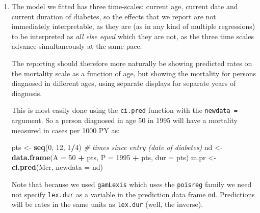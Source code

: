 \documentclass[
]{book}
\newenvironment{Shaded}{\begin{snugshade}}{\end{snugshade}}
\newcommand{\AttributeTok}[1]{\textcolor[rgb]{0.13,0.29,0.53}{#1}}
\newcommand{\CommentTok}[1]{\textcolor[rgb]{0.56,0.35,0.01}{\textit{#1}}}
\newcommand{\DecValTok}[1]{\textcolor[rgb]{0.00,0.00,0.81}{#1}}
\newcommand{\FunctionTok}[1]{\textcolor[rgb]{0.13,0.29,0.53}{\textbf{#1}}}
\newcommand{\NormalTok}[1]{#1}
\newcommand{\OtherTok}[1]{\textcolor[rgb]{0.56,0.35,0.01}{#1}}
\newcommand{\SpecialCharTok}[1]{\textcolor[rgb]{0.81,0.36,0.00}{\textbf{#1}}}
\theoremstyle{definition}
\theoremstyle{definition}
\theoremstyle{definition}
\theoremstyle{definition}
\theoremstyle{remark}
\begin{document}
\begin{enumerate}
\begin{verbatim}
Analysis of Deviance Table

Model 1: cbind(trt(Lx$lex.Cst, Lx$lex.Xst) %in% trnam, Lx$lex.dur) ~ s(A, 
    bs = "cr", k = 10) + s(P, bs = "cr", k = 10) + s(dur, bs = "cr", 
    k = 10)
Model 2: cbind(trt(Lx$lex.Cst, Lx$lex.Xst) %in% trnam, Lx$lex.dur) ~ s(A, 
    k = 10)
  Resid. Df Resid. Dev      Df Deviance  Pr(>Chi)
1     58112      10204                           
2     58122      10268 -9.4572  -63.366 4.812e-10
\end{verbatim}

  What do you conclude?
\item
  The model we fitted has three time-scales: current age, current
  date and current duration of diabetes, so the effects that we report
  are not immediately interpretable, as they are (as in any kind of
  multiple regressions) to be interpreted as \emph{all else equal} which
  they are not, as the three time scales advance simultaneously at the
  same pace.

  The reporting should therefore more naturally be showing predicted rates on the
  mortality scale as a function of age, but showing the mortality
  for persons diagnosed in different ages, using separate displays
  for separate years of diagnosis.

  This is most easily done using the \texttt{ci.pred} function with
  the \texttt{newdata\ =} argument. So a person diagnosed in age 50 in
  1995 will have a mortality measured in cases per 1000 PY as:

\begin{Shaded}
\begin{Highlighting}[]
\NormalTok{pts }\OtherTok{\textless{}{-}} \FunctionTok{seq}\NormalTok{(}\DecValTok{0}\NormalTok{, }\DecValTok{12}\NormalTok{, }\DecValTok{1}\SpecialCharTok{/}\DecValTok{4}\NormalTok{) }\CommentTok{\# times since entry (date of diabetes)}
\NormalTok{nd }\OtherTok{\textless{}{-}} \FunctionTok{data.frame}\NormalTok{(}\AttributeTok{A =} \DecValTok{50}   \SpecialCharTok{+}\NormalTok{ pts,}
                 \AttributeTok{P =} \DecValTok{1995} \SpecialCharTok{+}\NormalTok{ pts,}
               \AttributeTok{dur =}\NormalTok{        pts)}
\NormalTok{m.pr }\OtherTok{\textless{}{-}} \FunctionTok{ci.pred}\NormalTok{(Mcr, }\AttributeTok{newdata =}\NormalTok{ nd)}
\end{Highlighting}
\end{Shaded}

  Note that because we used \texttt{gamLexis} which uses
  the \texttt{poisreg} family we need not specify \texttt{lex.dur} as a
  variable in the prediction data frame \texttt{nd}. Predictions will
  be rates in the same units as \texttt{lex.dur} (well, the inverse).


\end{enumerate}
\end{document}
